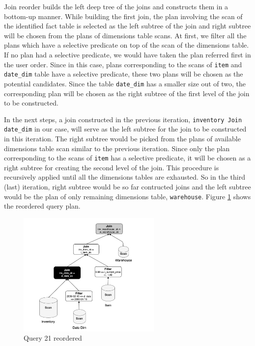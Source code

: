 Join reorder builds the left deep tree of the joins and constructs them in a bottom-up manner. While building the first join, the plan involving the scan of the identified fact table is selected as the left subtree of the join and right subtree will be chosen from the plans of dimensions table scans. At first, we filter all the plans which have a selective predicate on top of the scan of the dimensions table. If no plan had a selective predicate, we would have taken the plan referred first in the user order. Since in this case, plans corresponding to the scans of \texttt{item} and \texttt{date\_dim} table have a selective predicate, these two plans will be chosen as the potential candidates. Since the table \texttt{date\_dim} has a smaller size out of two, the corresponding plan will be chosen as the right subtree of the first level of the join to be constructed.

In the next steps, a join constructed in the previous iteration, \texttt{inventory Join date\_dim} in our case, will serve as the left subtree for the join to be constructed in this iteration. The right subtree would be picked from the plans of available dimensions table scan similar to the previous iteration. Since only the plan corresponding to the scans of \texttt{item} has a selective predicate, it will be chosen as a right subtree for creating the second level of the join. This procedure is recursively applied until all the dimensions tables are exhausted. So in the third (last) iteration, right subtree would be so far contructed joins and the left subtree would be the plan of only remaining dimensions table, \texttt{warehouse}. Figure \ref{with-reorder} shows the reordered query plan.

\begin{figure}[ht]
\centerline{\includegraphics[width=7cm]{fig/with-reorder.png}}
\caption{Query 21 reordered}
\label{with-reorder}
\end{figure}